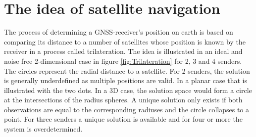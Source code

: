 \section{The idea of satellite navigation}\label{IdeaSatNav}
The process of determining a GNSS-receiver's position on earth is based on comparing its distance to a number of satellites whose position is known by the receiver in a process called trilateration. The idea is illustrated in an ideal and noise free 2-dimensional case in figure \ref{fig:Trilateration} for 2, 3 and 4 senders. The circles represent the radial distance to a satellite. For 2 senders, the solution is generally underdefined as multiple positions are valid. In a planar case that is illustrated with the two dots. In a 3D case, the solution space would form a circle at the intersections of the radius spheres. A unique solution only exists if both observations are equal to the corresponding radiuses and the circle collapses to a point. For three senders a unique solution is available and for four or more the system is overdetermined.
